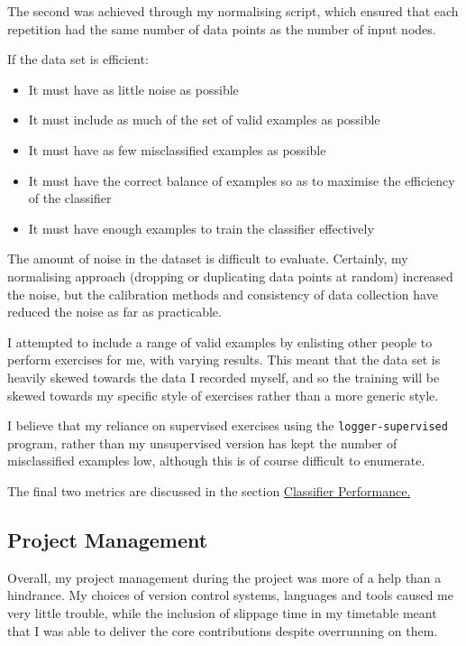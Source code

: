 \documentclass[a4paper]{article}
\begin{document}
The second was achieved through my normalising script, which ensured that each repetition had the same number of data points as the number of input nodes.

If the data set is efficient:

\begin{itemize}
\item It must have as little noise as possible
\item It must include as much of the set of valid examples as possible
\item It must have as few misclassified examples as possible
\item It must have the correct balance of examples so as to maximise the efficiency of the classifier
\item It must have enough examples to train the classifier effectively
\end{itemize}

The amount of noise in the dataset is difficult to evaluate. Certainly, my normalising approach (dropping or duplicating data points at random) increased the noise, but the calibration methods and consistency of data collection have reduced the noise as far as practicable.

I attempted to include a range of valid examples by enlisting other people to perform exercises for me, with varying results. This meant that the data set is heavily skewed towards the data I recorded myself, and so the training will be skewed towards my specific style of exercises rather than a more generic style.

I believe that my reliance on supervised exercises using the \lstinline{logger-supervised} program, rather than my unsupervised version has kept the number of misclassified examples low, although this is of course difficult to enumerate.

The final two metrics are discussed in the section \hyperref[subsec:ev_cp]{Classifier Performance.}

\subsection{Project Management}%
\label{subsec:ev_pm}

Overall, my project management during the project was more of a help than a hindrance. My choices of version control systems, languages and tools caused me very little trouble, while the inclusion of slippage time in my timetable meant that I was able to deliver the core contributions despite overrunning on them.
\end{document}
